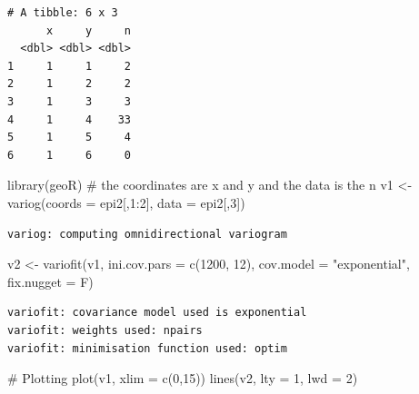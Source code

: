 \documentclass[
  letterpaper,
]{book}
\newenvironment{Shaded}{\begin{snugshade}}{\end{snugshade}}
\newcommand{\AttributeTok}[1]{\textcolor[rgb]{0.40,0.45,0.13}{#1}}
\newcommand{\CommentTok}[1]{\textcolor[rgb]{0.37,0.37,0.37}{#1}}
\newcommand{\DecValTok}[1]{\textcolor[rgb]{0.68,0.00,0.00}{#1}}
\newcommand{\FunctionTok}[1]{\textcolor[rgb]{0.28,0.35,0.67}{#1}}
\newcommand{\NormalTok}[1]{\textcolor[rgb]{0.00,0.23,0.31}{#1}}
\newcommand{\OtherTok}[1]{\textcolor[rgb]{0.00,0.23,0.31}{#1}}
\newcommand{\SpecialCharTok}[1]{\textcolor[rgb]{0.37,0.37,0.37}{#1}}
\newcommand{\StringTok}[1]{\textcolor[rgb]{0.13,0.47,0.30}{#1}}
\begin{document}
\begin{verbatim}
# A tibble: 6 x 3
      x     y     n
  <dbl> <dbl> <dbl>
1     1     1     2
2     1     2     2
3     1     3     3
4     1     4    33
5     1     5     4
6     1     6     0
\end{verbatim}

\begin{Shaded}
\begin{Highlighting}[]
\FunctionTok{library}\NormalTok{(geoR)}
\CommentTok{\# the coordinates are x and y and the data is the n}
\NormalTok{v1 }\OtherTok{\textless{}{-}} \FunctionTok{variog}\NormalTok{(}\AttributeTok{coords =}\NormalTok{ epi2[,}\DecValTok{1}\SpecialCharTok{:}\DecValTok{2}\NormalTok{], }\AttributeTok{data =}\NormalTok{ epi2[,}\DecValTok{3}\NormalTok{])}
\end{Highlighting}
\end{Shaded}

\begin{verbatim}
variog: computing omnidirectional variogram
\end{verbatim}

\begin{Shaded}
\begin{Highlighting}[]
\NormalTok{v2 }\OtherTok{\textless{}{-}} \FunctionTok{variofit}\NormalTok{(v1, }\AttributeTok{ini.cov.pars =} \FunctionTok{c}\NormalTok{(}\DecValTok{1200}\NormalTok{, }\DecValTok{12}\NormalTok{), }
               \AttributeTok{cov.model =} \StringTok{"exponential"}\NormalTok{, }
               \AttributeTok{fix.nugget =}\NormalTok{ F)}
\end{Highlighting}
\end{Shaded}

\begin{verbatim}
variofit: covariance model used is exponential 
variofit: weights used: npairs 
variofit: minimisation function used: optim 
\end{verbatim}

\begin{Shaded}
\begin{Highlighting}[]
\CommentTok{\# Plotting }
\FunctionTok{plot}\NormalTok{(v1, }\AttributeTok{xlim =} \FunctionTok{c}\NormalTok{(}\DecValTok{0}\NormalTok{,}\DecValTok{15}\NormalTok{))}
\FunctionTok{lines}\NormalTok{(v2, }\AttributeTok{lty =} \DecValTok{1}\NormalTok{, }\AttributeTok{lwd =} \DecValTok{2}\NormalTok{)}
\end{Highlighting}
\end{Shaded}
\end{document}
